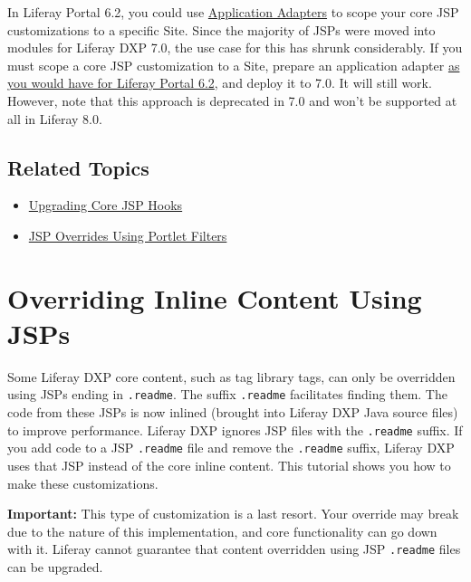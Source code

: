 In Liferay Portal 6.2, you could use
\href{/docs/6-2/tutorials/-/knowledge_base/t/customizing-sites-and-site-templates-with-application-adapters}{Application
Adapters} to scope your core JSP customizations to a specific Site.
Since the majority of JSPs were moved into modules for Liferay DXP 7.0,
the use case for this has shrunk considerably. If you must scope a core
JSP customization to a Site, prepare an application adapter
\href{/docs/6-2/tutorials/-/knowledge_base/t/customizing-sites-and-site-templates-with-application-adapters}{as
you would have for Liferay Portal 6.2}, and deploy it to 7.0. It will
still work. However, note that this approach is deprecated in 7.0 and
won't be supported at all in Liferay 8.0.

\section{Related Topics}\label{related-topics-18}

\begin{itemize}
\tightlist
\item
  \href{/docs/7-1/tutorials/-/knowledge_base/t/upgrading-core-jsp-hooks}{Upgrading
  Core JSP Hooks}
\item
  \href{/docs/7-2/customization/-/knowledge_base/c/jsp-overrides-using-portlet-filters}{JSP
  Overrides Using Portlet Filters}
\end{itemize}

\chapter{Overriding Inline Content Using
JSPs}\label{overriding-inline-content-using-jsps}

Some Liferay DXP core content, such as tag library tags, can only be
overridden using JSPs ending in \texttt{.readme}. The suffix
\texttt{.readme} facilitates finding them. The code from these JSPs is
now inlined (brought into Liferay DXP Java source files) to improve
performance. Liferay DXP ignores JSP files with the \texttt{.readme}
suffix. If you add code to a JSP \texttt{.readme} file and remove the
\texttt{.readme} suffix, Liferay DXP uses that JSP instead of the core
inline content. This tutorial shows you how to make these
customizations.

\noindent\hrulefill

\textbf{Important:} This type of customization is a last resort. Your
override may break due to the nature of this implementation, and core
functionality can go down with it. Liferay cannot guarantee that content
overridden using JSP \texttt{.readme} files can be upgraded.

